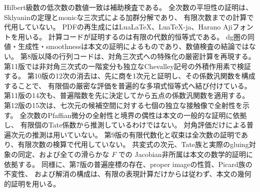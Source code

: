 Hilbert級数の低次数の数値一致は補助検査である。
全次数の平坦性の証明は、Sklyaninの定理とmonicな三次式による加群分解であり、
有限次数までの計算で代用していない。
PDFの再生成にはLuaLaTeX、LuaTeX-ja、Harano Ajiフォントを用いる。
計算コードが証明するのは有限の代数的恒等式である。
dg圏の同値・生成性・smoothnessは本文の証明によるものであり、数値検査の結論ではない。
第8版以降の行列コードは、対角三次式への特殊化の厳密計算を再現する。
第11版では非対角三次式の一階変分も独立なChevalley記号の外積作用素で検証する。
第10版の12次の消去は、先に商を1次元と証明し、その係数汎関数を構成することで、
有限個の厳密な評価を普遍的な多項式恒等式へ結び付けている。
第11版の14次も、普遍階数を先に決定してから五点の係数汎関数を適用する。
第12版の15次は、七次元の候補空間に対する七個の独立な接触像で全射性を示す。
全次数のPfaffian微分の全射性と境界の偶性は本文の一般的な証明に依拠し、
有限個のTate係数から推測しているわけではない。
対角評価だけによる普遍次元の推測は用いていない。
第9版の有限代数化と収束は全次数の証明であり、有限次数の検算で代用していない。
共変式の次元、Tate族と実際のgluing対象の同定、および全ての滑らかな $F$ での
Jacobian非所属は本文の数学的証明に依拠する。
同様に、第7版の普遍座標の存在、proper imageの性質、Picard族の不変性、
および解消の構成は、有限の表現計算だけからは従わず、本文の幾何的証明を用いる。

\clearpage
